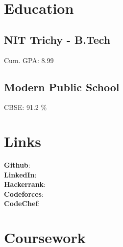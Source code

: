 \documentclass[]{deedy-resume-openfont}
\begin{document}
\lastupdated


\begin{minipage}[t]{0.30\textwidth}

\section{Education}

\subsection{NIT Trichy - B.Tech}
Cum. GPA: 8.99 \\
\sectionsep

\subsection{Modern Public School}
CBSE: 91.2 \% \\


\section{Links}
\textbf{Github}: \href{https://github.com/adityaa30}{} \\
\textbf{LinkedIn}: \href{https://www.linkedin.com/in/adityaa30/}{} \\
\textbf{Hackerrank}: \href{https://www.hackerrank.com/adityaa30?hr_r=1}{} \\
\textbf{Codeforces}: \href{https://codeforces.com/profile/adityaa30}{} \\
\textbf{CodeChef}: \href{https://www.codechef.com/users/adityaa30}{}

\section{Coursework}


\end{minipage}
\end{document}
